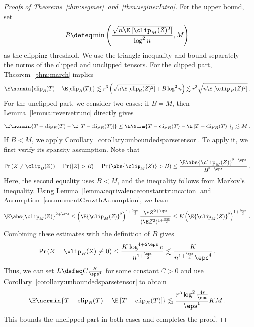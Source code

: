 \documentclass[11pt,a4paper]{article}
\begin{document}
\begin{proof}[Proofs of Theorems~\ref{thm:seginer}~and~\ref{thm:seginerIntro}]
    For the upper bound, set 
    \[
        B \defeq \min \left(\frac{\sqrt{n \E\left[\clip_M(Z)^2\right]} }{\log^2 n},  M \right)
    \]
    as the clipping threshold. We use the triangle inequality and bound separately the norms of the clipped and unclipped tensors. For the clipped part, Theorem~\ref{thm:march} implies 
    \[
        \E \normin{ \operatorname{clip}_B(T)- \E \left[\operatorname{clip}_B(T) \right]} \lesssim r^3 \left( \sqrt{n \E\left[\operatorname{clip}_B(Z)^2 \right]} + B \log^2 n \right) \lesssim  r^3 \sqrt{n \E\left[\clip_M(Z)^2 \right]}\,.
    \]
    For the unclipped part, we consider two cases:
    if $B=M$, then  Lemma~\ref{lemma:reversetrunc} directly gives
    \[
        \E \normin{ T- \operatorname{clip}_B(T) - \E \left[T- \operatorname{clip}_B(T)\right]} \le  \E \Norm{ T- \operatorname{clip}_B(T) - \E \left[T- \operatorname{clip}_B(T)\right]}_1 \lesssim M\,.
    \]
    If $B <M$, we apply Corollary~\ref{corollary:unboundedsparsetensor}. To apply it, we first verify its sparsity assumption. Note that
    \[
        \Pr\left(Z \neq \clip_B(Z) \right) = \Pr\left(|Z| >B \right) = \Pr\left(\abs{\clip_M(Z)} >B \right)  \leq \frac{\E \abs{\clip_M(Z)}^{2 + \eps}}{ B^{2+\eps}}\,.
    \]
    Here, the second equality uses $B<M$, and the inequality follows from Markov’s inequality. Using Lemma~\ref{lemma:equivalenceconstanttruncation} and Assumption~\ref{ass:momentGrowthAssumption}, we have
    \[
        \E \abs{\clip_M(Z)}^{2 + \eps}\le \left(\E {\clip_M(Z)}^2\right)^{1+\frac \eps 2} \frac {\E Z^{2+\eps}} {(\E Z^2)^{1+\frac \eps 2}}\le K \left(\E {\clip_M(Z)}^2\right)^{1+\frac \eps 2}\,.
    \]
    Combining these estimates with the definition of $B$ gives
    \[
        \Pr\left(Z - \clip_B(Z) \ne 0\right)\le \frac {K\log^{4+2\eps} n} {n^{1+\frac \eps 2}}\lesssim \frac {K} {n^{1+\frac \eps 4} \eps^4}\,.
    \]
    Thus, we can set $L \defeq C\frac{K }{ \eps^{4} }$ for some constant $C>0$ and use Corollary~\ref{corollary:unboundedsparsetensor} to obtain
    \[
        \E \normin{ T- \operatorname{clip}_B(T) - \E \left[T- \operatorname{clip}_B(T)\right]} \lesssim \frac{r^5 \log^2 \frac {4r} \eps }{ \eps^{6} } KM\,.
    \]
    This bounds the unclipped part in both cases and completes the proof.
\end{proof}
\end{document}
